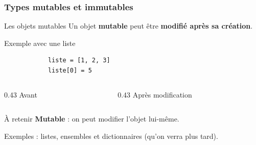 \documentclass[10pt, xcolor={svgnames}]{beamer}
\begin{document}
\begin{frame}[fragile]
	\frametitle{Types mutables et immutables}
	
	\begin{block}{Les objets mutables}
		Un objet \textbf{mutable} peut être \textbf{modifié après sa création}.
	\end{block}
	
	\vspace{0.15cm}
	
	\begin{exampleblock}{Exemple avec une liste}
		\begin{verbatim}
			liste = [1, 2, 3]
			liste[0] = 5
		\end{verbatim}
	\end{exampleblock}
	
	\vspace{0.15cm}
	
	\begin{columns}[T]
		\begin{column}{0.43\textwidth}
			\centering
			Avant\\[0.15cm]
		\end{column}
		
		\begin{column}{0.43\textwidth}
			\centering
			Après modification\\[0.15cm]
		\end{column}
	\end{columns}
	
	\vspace{0.2cm}
	
	\begin{alertblock}{À retenir}
		\centering
		\textbf{Mutable} : on peut modifier l'objet lui-même.
		
		\medskip
		
		Exemples : listes, ensembles et dictionnaires (qu'on verra plus tard).
	\end{alertblock}
\end{frame}
\end{document}
